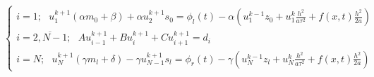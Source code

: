 \documentclass[12pt]{article}
\begin{document}
\begin{enumerate}
\begin{itemize}
\begin{equation*}
\begin{cases}
                    i=1;\:\:\: u_1^{k+1}(\alpha m_0+\beta) + \alpha u_2^{k+1}s_0 = \phi_l(t)-\alpha\left( u_1^{k-1}z_0 + u_1^k\frac{h^2}{a\tau^2}  + f(x,t)\frac{h^2}{2a}\right)
                    \\
                    i=\overline{2,N-1};\:\:\:Au_{i-1}^{k+1} + Bu_i^{k+1} +Cu_{i+1}^{k+1}=d_i
                    \\
                    i=N;\:\:\: u_{N}^{k+1}(\gamma m_l+\delta) - \gamma u_{N-1}^{k+1}s_l = \phi_r(t) - \gamma\left( u_{N}^{k-1}z_l + u_{N}^{k}\frac{h^2}{a\tau^2} + f(x,t)\frac{h^2}{2a} \right)
                \end{cases}
            \end{equation*}
        \end{itemize}
    \end{enumerate}
\end{document}
